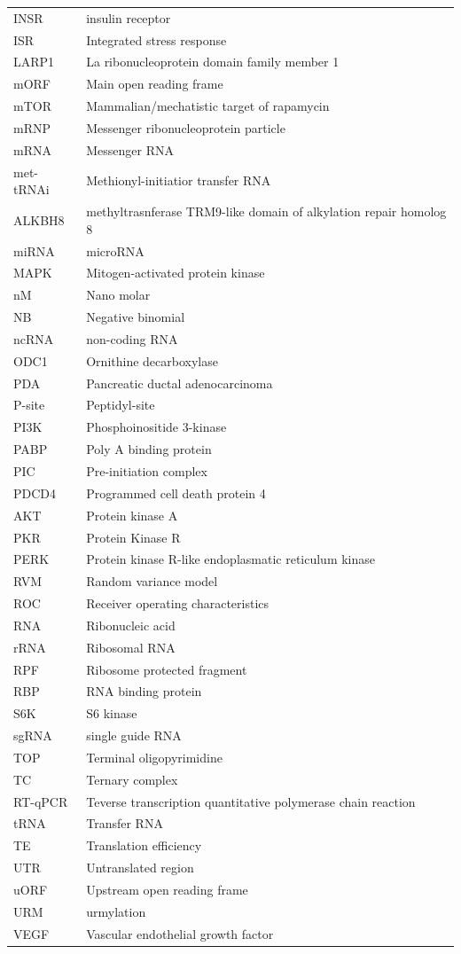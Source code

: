\documentclass[
  12pt,
  openany]{book}
\begin{document}
\begin{longtable}{ll}
INSR & insulin receptor\\
\addlinespace
ISR & Integrated stress response\\
LARP1 & La ribonucleoprotein domain family member 1\\
mORF & Main open reading frame\\
mTOR & Mammalian/mechatistic target of rapamycin\\
mRNP & Messenger ribonucleoprotein particle\\
\addlinespace
mRNA & Messenger RNA\\
met-tRNAi & Methionyl-initiatior transfer RNA\\
ALKBH8 & methyltrasnferase TRM9-like domain of alkylation repair homolog 8\\
miRNA & microRNA\\
MAPK & Mitogen-activated protein
kinase\\
\addlinespace
nM & Nano molar\\
NB & Negative binomial\\
ncRNA & non-coding RNA\\
ODC1 & Ornithine decarboxylase\\
PDA & Pancreatic ductal adenocarcinoma\\
\addlinespace
P-site & Peptidyl-site\\
PI3K & Phosphoinositide 3-kinase\\
PABP & Poly A binding protein\\
PIC & Pre-initiation complex\\
PDCD4 & Programmed cell death protein 4\\
\addlinespace
AKT & Protein kinase A\\
PKR & Protein Kinase R\\
PERK & Protein kinase R-like endoplasmatic reticulum kinase\\
RVM & Random variance model\\
ROC & Receiver operating characteristics\\
\addlinespace
RNA & Ribonucleic acid\\
rRNA & Ribosomal RNA\\
RPF & Ribosome protected fragment\\
RBP & RNA binding protein\\
S6K & S6 kinase\\
\addlinespace
sgRNA & single guide RNA\\
TOP & Terminal oligopyrimidine\\
TC & Ternary complex\\
RT-qPCR & Teverse transcription quantitative polymerase chain
reaction\\
tRNA & Transfer RNA\\
\addlinespace
TE & Translation efficiency\\
UTR & Untranslated region\\
uORF & Upstream open reading frame\\
URM & urmylation\\
VEGF & Vascular endothelial growth factor\\*
\end{longtable}
\clearpage
{}
\end{document}
